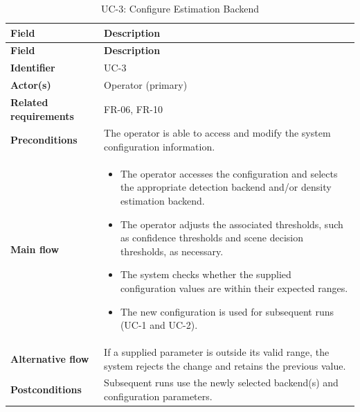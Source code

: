 \begin{longtable}{|
    >{\raggedright\arraybackslash}p{3.0cm}|
    >{\raggedright\arraybackslash}p{\dimexpr\textwidth-3.0cm-4\tabcolsep-3\arrayrulewidth\relax}|
}
\caption{UC-3: Configure Estimation Backend}
\label{tab:uc3} \\

\hline
\textbf{Field} & \textbf{Description} \\
\hline
\endfirsthead

\hline
\textbf{Field} & \textbf{Description} \\
\hline
\endhead

\textbf{Identifier} &
UC-3
\\
\hline

\textbf{Actor(s)} &
Operator (primary)
\\
\hline

\textbf{Related requirements} &
FR-06, FR-10
\\
\hline

\textbf{Preconditions} &
The operator is able to access and modify the system configuration information.
\\
\hline

\textbf{Main flow} &
\begin{itemize}[leftmargin=16pt, itemsep=0pt, topsep=0pt]
    \item The operator accesses the configuration and selects the appropriate detection backend and/or density estimation backend.

    \item The operator adjusts the associated thresholds, such as confidence thresholds and scene decision thresholds, as necessary.

    \item The system checks whether the supplied configuration values are within their expected ranges.

    \item The new configuration is used for subsequent runs (UC-1 and UC-2).
\end{itemize}
\\
\hline

\textbf{Alternative flow} &
If a supplied parameter is outside its valid range, the system rejects the change and retains the previous value.
\\
\hline

\textbf{Postconditions} &
Subsequent runs use the newly selected backend(s) and configuration parameters.
\\
\hline

\end{longtable}

